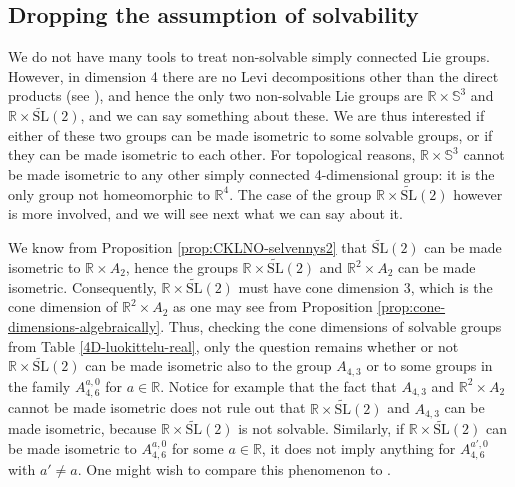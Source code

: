 \documentclass[a4paper,12pt]{amsart}
\newcommand{\pp}{\mathrm}
\DeclarePairedDelimiter\braket{\langle}{\rangle}
\theoremstyle{plain}
\theoremstyle{definition}
\theoremstyle{plain}
\theoremstyle{remark}
\begin{document}
\subsection{Dropping the assumption of solvability}
	We do not have many tools to treat non-solvable simply connected Lie groups. However, in dimension 4 there are no Levi decompositions other than the direct products (see \cite[p.\ 301]{MacCallum1999}), and hence the only two non-solvable Lie groups are \( \mathbb{R} \times  \mathbb{S}^3 \) and \( \mathbb{R} \times \widetilde{\pp{SL}}(2) \), and we can say something about these.
	We are thus interested if either of these two groups can be made isometric to some solvable groups, or if they can be made isometric to each other. For topological reasons, \( \mathbb{R} \times  \mathbb{S}^3 \) cannot be made isometric to any other simply connected 4-dimensional group: it is the only group not homeomorphic to \( \mathbb{R}^4 \).
	The case of the group \( \mathbb{R} \times \widetilde{\pp{SL}}(2) \) however is more involved, and we will see next what we can say about it.
	
	We know from Proposition \ref{prop:CKLNO-selvennys2} that \(\widetilde{\pp{SL}}(2) \) can be made isometric to \( \mathbb{R} \times A_2 \), hence the groups \( \mathbb{R} \times \widetilde{\pp{SL}}(2) \) and \( \mathbb{R}^2 \times A_2 \) can be made isometric. Consequently, \( \mathbb{R} \times \widetilde{\pp{SL}}(2) \) must have cone dimension 3, which is the cone dimension of \( \mathbb{R}^2 \times A_2 \) as one may see from Proposition \ref{prop:cone-dimensions-algebraically}.
	Thus, checking the cone dimensions of solvable groups from Table \ref{4D-luokittelu-real}, only the question remains
	whether or not  \( \mathbb{R} \times \widetilde{\pp{SL}}(2) \) can be made isometric also to the group \( A_{4,3} \) or to some groups in the family \( A_{4,6}^{a,0} \) for \( a \in \mathbb{R} \).
	Notice for example that 
	the fact that \( A_{4,3} \) and \( \mathbb{R}^2 \times A_2 \) cannot be made isometric
	does not rule out that \( \mathbb{R} \times \widetilde{\pp{SL}}(2) \) and \( A_{4,3} \) can be made isometric, because \( \mathbb{R} \times \widetilde{\pp{SL}}(2) \) is not solvable.
	Similarly, if \( \mathbb{R} \times \widetilde{\pp{SL}}(2) \) can be made isometric to \( A_{4,6}^{a,0} \) for some \( a \in \mathbb{R} \), it does not imply anything for \( A_{4,6}^{a',0} \) with \( a' \neq a \). One might wish to compare this phenomenon to \cite[Theorem 4.21]{avain:CKLNO}.
	
\end{document}
